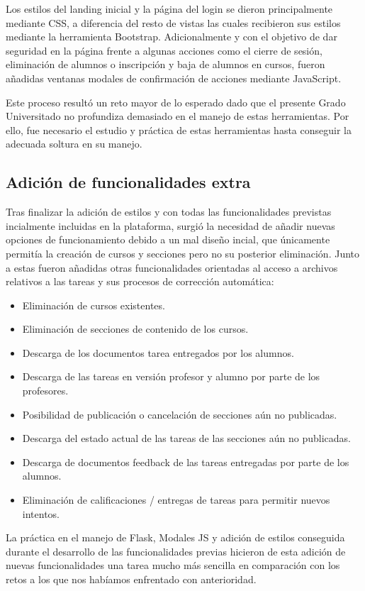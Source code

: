 Los estilos del landing inicial y la página del login se dieron principalmente mediante CSS, a diferencia del resto de vistas las cuales recibieron sus estilos mediante la herramienta Bootstrap. Adicionalmente y con el objetivo de dar seguridad en la página frente a algunas acciones como el cierre de sesión, eliminación de alumnos o inscripción y baja de alumnos en cursos, fueron añadidas ventanas modales de confirmación de acciones mediante JavaScript.

Este proceso resultó un reto mayor de lo esperado dado que el presente Grado Universitado no profundiza demasiado en el manejo de estas herramientas. Por ello, fue necesario el estudio y práctica de estas herramientas hasta conseguir la adecuada soltura en su manejo.

\subsection{Adición de funcionalidades extra}
Tras finalizar la adición de estilos y con todas las funcionalidades previstas incialmente incluidas en la plataforma, surgió la necesidad de añadir nuevas opciones de funcionamiento debido a un mal diseño incial, que únicamente permitía la creación de cursos y secciones pero no su posterior eliminación. Junto a estas fueron añadidas otras funcionalidades orientadas al acceso a archivos relativos a las tareas y sus procesos de corrección automática:
\begin{itemize}
\item Eliminación de cursos existentes.
\item Eliminación de secciones de contenido de los cursos.
\item Descarga de los documentos tarea entregados por los alumnos.
\item Descarga de las tareas en versión profesor y alumno por parte de los profesores.
\item Posibilidad de publicación o cancelación de secciones aún no publicadas.
\item Descarga del estado actual de las tareas de las secciones aún no publicadas.
\item Descarga de documentos feedback de las tareas entregadas por parte de los alumnos.
\item Eliminación de calificaciones / entregas de tareas para permitir nuevos intentos.
\end{itemize}

La práctica en el manejo de Flask, Modales JS y adición de estilos conseguida durante el desarrollo de las funcionalidades previas hicieron de esta adición de nuevas funcionalidades una tarea mucho más sencilla en comparación con los retos a los que nos habíamos enfrentado con anterioridad.

